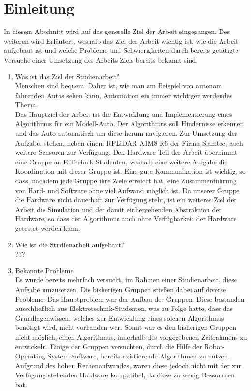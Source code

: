 \section{Einleitung}
In diesem Abschnitt wird auf das generelle Ziel der Arbeit eingegangen.
Des weiteren wird Erläutert, weshalb das Ziel der Arbeit wichtig ist, wie die Arbeit aufgebaut ist und welche Probleme und Schwierigkeiten durch bereits getätigte Versuche einer Umsetzung des Arbeits-Ziels bereits bekannt sind.

\begin{enumerate}
    \item Was ist das Ziel der Studienarbeit?\\
    Menschen sind bequem.
    Daher ist, wie man am Beispiel von autonom fahrenden Autos sehen kann, Automation ein immer wichtiger werdendes Thema.\\

    Das Hauptziel der Arbeit ist die Entwicklung und Implementierung eines Algorithmus für ein Modell-Auto. 
    Der Algorithmus soll Hindernisse erkennen und das Auto automatisch um diese herum navigieren.
    Zur Umsetzung der Aufgabe, stehen, neben einem RPLiDAR A1M8-R6 der Firma Slamtec, auch weitere Sensoren zur Verfügung.
    Den Hardware-Teil der Arbeit übernimmt eine Gruppe an E-Technik-Studenten, weshalb eine weitere Aufgabe die Koordination mit dieser Gruppe ist.
    Eine gute Kommunikation ist wichtig, so dass, nachdem jede Gruppe ihre Ziele erreicht hat, eine Zusammenführung von Hard- und Software ohne viel Aufwand möglich ist.
    Da unserer Gruppe die Hardware nicht dauerhaft zur Verfügung steht, ist ein weiteres Ziel der Arbeit die Simulation und der damit einhergehenden Abstraktion der Hardware, so dass der Algorithmus auch ohne Verfügbarkeit der Hardware getestet werden kann.    

    \item Wie ist die Studienarbeit aufgebaut?\\
    ???

    \item Bekannte Probleme\\
    Es wurde bereits mehrfach versucht, im Rahmen einer Studienarbeit, diese Aufgabe umzusetzen.
    Die bisherigen Gruppen stießen dabei auf diverse Probleme.
    Das Hauptproblem war der Aufbau der Gruppen.
    Diese bestanden ausschließlich aus Elektrotechnik-Studenten, was zu Folge hatte, dass das Grundlagenwissen, welches zur Entwicklung eines solchen Algorithmus benötigt wird, nicht vorhanden war.
    Somit war es den bisherigen Gruppen nicht möglich, einen Algorithmus, innerhalb des vorgegebenen Zeitrahmens zu entwickeln.
    Einige der Gruppen versuchten, durch die Hilfe der Robot-Operating-System-Software, bereits existierende Algorithmen zu nutzen. 
    Aufgrund des hohen Rechenaufwandes, waren diese jedoch nicht mit der zur Verfügung stehenden Hardware kompatibel, da diese zu wenig Ressourcen bat.\\


\end{enumerate}
